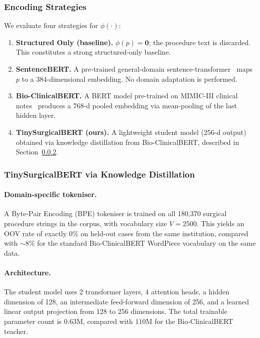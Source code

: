 \subsubsection{Encoding Strategies}

We evaluate four strategies for $\phi(\cdot)$:

\begin{enumerate}
  \item \textbf{Structured Only (baseline).}  $\phi(p) = \mathbf{0}$; the procedure text is discarded. This constitutes a strong structured-only baseline.
  \item \textbf{SentenceBERT.}  A pre-trained general-domain sentence-transformer~\cite{reimers2019sentencebert} maps $p$ to a 384-dimensional embedding. No domain adaptation is performed.
  \item \textbf{Bio-ClinicalBERT.}  A BERT model pre-trained on MIMIC-III clinical notes~\cite{alsentzer2019bioclinicalbert} produces a 768-d pooled embedding via mean-pooling of the last hidden layer.
  \item \textbf{TinySurgicalBERT (ours).}  A lightweight student model (256-d output) obtained via knowledge distillation from Bio-ClinicalBERT, described in Section~\ref{sec:kd}.
\end{enumerate}

\subsubsection{TinySurgicalBERT via Knowledge Distillation}
\label{sec:kd}

\paragraph{Domain-specific tokeniser.}
A Byte-Pair Encoding (BPE) tokeniser is trained on all 180,370 surgical procedure strings in the corpus, with vocabulary size $V = 2500$. This yields an OOV rate of exactly $0\%$ on held-out cases from the same institution, compared with $\sim\!8\%$ for the standard Bio-ClinicalBERT WordPiece vocabulary on the same data.

\paragraph{Architecture.}
The student model uses 2 transformer layers, 4 attention heads, a hidden dimension of 128, an intermediate feed-forward dimension of 256, and a learned linear output projection from 128 to 256 dimensions. The total trainable parameter count is $0.63\text{M}$, compared with $110\text{M}$ for the Bio-ClinicalBERT teacher.

